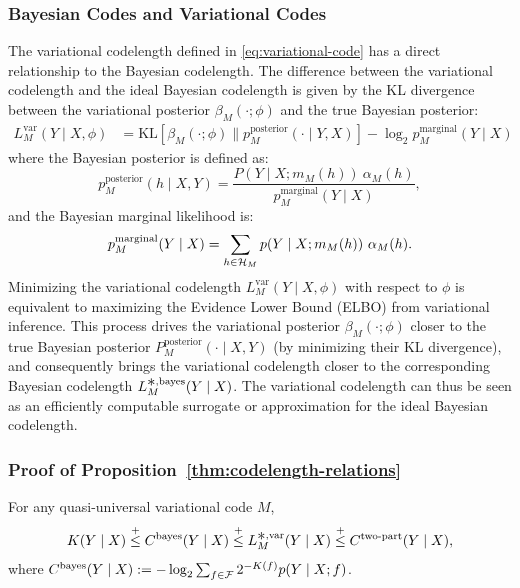 \subsubsection{Bayesian Codes and Variational Codes}
\label{sec:bayesian-lower-bound}

The variational codelength defined in \eqref{eq:variational-code} has a direct relationship to the Bayesian codelength. The difference between the variational codelength and the ideal Bayesian codelength is given by the KL divergence between the variational posterior $\beta_M(\cdot;\phi)$ and the true Bayesian posterior:
\begin{align}
L_M^{\text{var}}(Y \mid X,\phi) 
&= \text{KL}\left[ \beta_M(\cdot;\phi) \parallel p^{\text{posterior}}_M(\cdot \mid Y,X) \right] - \log_2 p^{\text{marginal}}_M(Y \mid X)
\label{eq:variational-data-likelihood}
\end{align}
where the Bayesian posterior is defined as:
\begin{equation}
    p^{\text{posterior}}_M(h \mid X, Y) = \frac{P(Y \mid X;m_M(h)) ~\alpha_M(h)}{p^{\text{marginal}}_M(Y \mid X)},
\end{equation}
and the Bayesian marginal likelihood is:
\begin{equation}
    p^{\text{marginal}}_M(Y \mid X) = \sum_{h \in {\mathcal{H}}_M} p(Y \mid X;m_M(h))~\alpha_M(h).
    \label{eq:bayes-marginal}
\end{equation}
Minimizing the variational codelength $L_M^{\text{var}}(Y \mid X,\phi)$ with respect to $\phi$ is equivalent to maximizing the Evidence Lower Bound (ELBO) from variational inference. This process drives the variational posterior $\beta_M(\cdot;\phi)$ closer to the true Bayesian posterior $P^{\text{posterior}}_M(\cdot \mid X,Y)$ (by minimizing their KL divergence), and consequently brings the variational codelength closer to the corresponding Bayesian codelength $L^{\bigast,\text{bayes}}_M(Y \mid X)$. The variational codelength can thus be seen as an efficiently computable surrogate or approximation for the ideal Bayesian codelength.

\subsubsection{Proof of Proposition~\ref{thm:codelength-relations}}\label{sec:proof-of-thm-codelength-relations}

\begin{prop*}
For any quasi-universal variational code $M$,
\begin{equation}
    K(Y \mid X) \leqc C^{\text{bayes}}(Y \mid X) \leqc L^{\bigast,\text{var}}_{M}(Y \mid X) \leqc C^{\text{two-part}}(Y \mid X),
\end{equation}
where $C^{\text{bayes}}(Y \mid X) := -\log_2 \sum_{f \in {\mathcal{F}}} 2^{-K(f)} p(Y \mid X;f)$.
\end{prop*}

